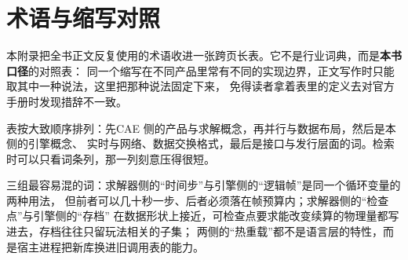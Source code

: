 \documentclass[12pt,a4paper,fontset=fandol]{ctexbook}
\newcommand{\Lang}[1]{\textsf{#1}}
\newcommand{\DomCAE}{\Lang{CAE}}
\begin{document}
\chapter{术语与缩写对照}
\label{ch:apA-glossary}

本附录把全书正文反复使用的术语收进一张跨页长表。它不是行业词典，而是\textbf{本书口径}的对照表：
同一个缩写在不同产品里常有不同的实现边界，正文写作时只能取其中一种说法，这里把那种说法固定下来，
免得读者拿着表里的定义去对官方手册时发现措辞不一致。

表按大致顺序排列：先\DomCAE{} 侧的产品与求解概念，再并行与数据布局，然后是本侧的引擎概念、
实时与网络、数据交换格式，最后是接口与发行层面的词。检索时可以只看词条列，那一列刻意压得很短。

\begin{note}[title={同一概念在两侧叫法不同}]
三组最容易混的词：求解器侧的``时间步''与引擎侧的``逻辑帧''是同一个循环变量的两种用法，
但前者可以几十秒一步、后者必须落在帧预算内；求解器侧的``检查点''与引擎侧的``存档''
在数据形状上接近，可检查点要求能改变续算的物理量都写进去，存档往往只留玩法相关的子集；
两侧的``热重载''都不是语言层的特性，而是宿主进程把新库换进旧调用表的能力。
\end{note}
\end{document}
